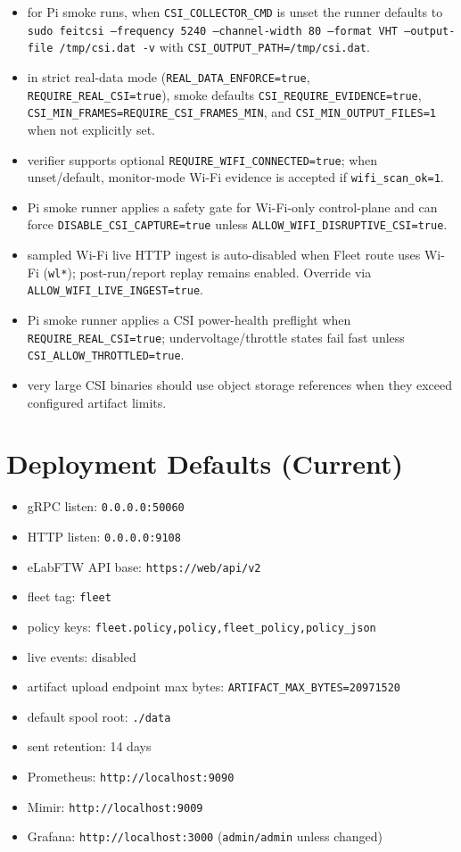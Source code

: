 \documentclass[11pt,a4paper]{article}
\begin{document}
\begin{itemize}
  \item for Pi smoke runs, when \texttt{CSI\_COLLECTOR\_CMD} is unset the runner defaults to \texttt{sudo feitcsi --frequency 5240 --channel-width 80 --format VHT --output-file /tmp/csi.dat -v} with \texttt{CSI\_OUTPUT\_PATH=/tmp/csi.dat}.
  \item in strict real-data mode (\texttt{REAL\_DATA\_ENFORCE=true}, \texttt{REQUIRE\_REAL\_CSI=true}), smoke defaults \texttt{CSI\_REQUIRE\_EVIDENCE=true}, \texttt{CSI\_MIN\_FRAMES=REQUIRE\_CSI\_FRAMES\_MIN}, and \texttt{CSI\_MIN\_OUTPUT\_FILES=1} when not explicitly set.
  \item verifier supports optional \texttt{REQUIRE\_WIFI\_CONNECTED=true}; when unset/default, monitor-mode Wi-Fi evidence is accepted if \texttt{wifi\_scan\_ok=1}.
  \item Pi smoke runner applies a safety gate for Wi-Fi-only control-plane and can force \texttt{DISABLE\_CSI\_CAPTURE=true} unless \texttt{ALLOW\_WIFI\_DISRUPTIVE\_CSI=true}.
  \item sampled Wi-Fi live HTTP ingest is auto-disabled when Fleet route uses Wi-Fi (\texttt{wl*}); post-run/report replay remains enabled. Override via \texttt{ALLOW\_WIFI\_LIVE\_INGEST=true}.
  \item Pi smoke runner applies a CSI power-health preflight when \texttt{REQUIRE\_REAL\_CSI=true}; undervoltage/throttle states fail fast unless \texttt{CSI\_ALLOW\_THROTTLED=true}.
  \item very large CSI binaries should use object storage references when they exceed configured artifact limits.
\end{itemize}

\section{Deployment Defaults (Current)}
\begin{itemize}
  \item gRPC listen: \texttt{0.0.0.0:50060}
  \item HTTP listen: \texttt{0.0.0.0:9108}
  \item eLabFTW API base: \texttt{https://web/api/v2}
  \item fleet tag: \texttt{fleet}
  \item policy keys: \texttt{fleet.policy,policy,fleet\_policy,policy\_json}
  \item live events: disabled
  \item artifact upload endpoint max bytes: \texttt{ARTIFACT\_MAX\_BYTES=20971520}
  \item default spool root: \texttt{./data}
  \item sent retention: 14 days
  \item Prometheus: \texttt{http://localhost:9090}
  \item Mimir: \texttt{http://localhost:9009}
  \item Grafana: \texttt{http://localhost:3000} (\texttt{admin/admin} unless changed)
\end{itemize}
\end{document}
